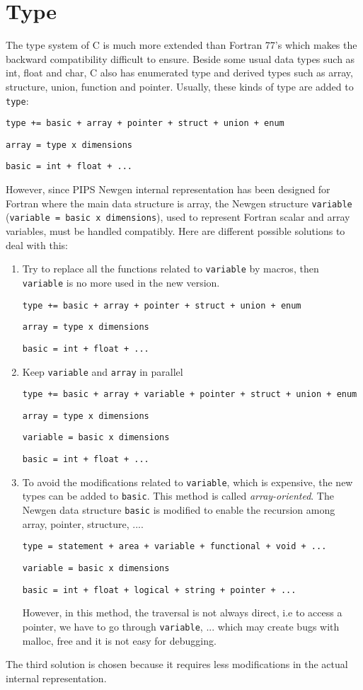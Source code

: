 \documentclass[a4paper]{report}
\begin{document}
\chapter{Type}

The type system of C is much more extended than Fortran 77's
which makes the backward compatibility difficult to ensure.  
Beside some usual data types such as int, float and char, C also has 
enumerated type and derived types such as array, structure, union, function
and pointer. 
Usually, these kinds of type are added to \verb/type/:
 
\verb/type += basic + array + pointer + struct + union + enum/

\verb/array = type x dimensions/

\verb/basic = int + float + .../

However, since PIPS Newgen internal representation has been designed for
Fortran where the main data structure is array, the Newgen structure
\verb/variable/ (\verb/variable = basic x dimensions/), used to represent Fortran scalar and
array variables, must be handled compatibly. 
Here are different possible solutions to deal with this:
\begin{enumerate}
\item Try to replace all the functions related to \verb/variable/ by
  macros, then \verb/variable/ is no more used in the new version.

\verb/type += basic + array + pointer + struct + union + enum/

\verb/array = type x dimensions/

\verb/basic = int + float + .../
\item Keep \verb/variable/ and \verb/array/ in parallel 

\verb/type += basic + array + variable + pointer + struct + union + enum/

\verb/array = type x dimensions/

\verb/variable = basic x dimensions/

\verb/basic = int + float + .../

\item To avoid the modifications related to \verb/variable/, which is expensive, the new types
  can be added to \verb/basic/. This method is called {\it
  array-oriented}. The
Newgen data structure \verb/basic/ is modified to enable the recursion
among array, pointer, structure, .... 
  
\verb/type = statement + area + variable + functional + void + .../

\verb/variable = basic x dimensions /

\verb/basic = int + float + logical + string + pointer + .../

However, in this method, the traversal is not always direct, i.e to access a
pointer, we have to go through \verb/variable/, ... which may create 
bugs with malloc, free and it is not easy for debugging. 
\end{enumerate}
The third solution is chosen because it requires less modifications in
the actual internal representation. 
\end{document}
